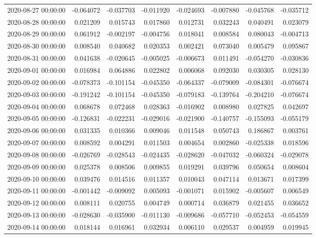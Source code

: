 \begin{tabular}{lrrrrrrr}
2020-08-27 00:00:00 & -0.064072 & -0.037703 & -0.011920 & -0.024693 & -0.007880 & -0.045768 & -0.035712 \\
2020-08-28 00:00:00 & 0.021209 & 0.015743 & 0.017860 & 0.012731 & 0.032243 & 0.040491 & 0.023079 \\
2020-08-29 00:00:00 & 0.061912 & -0.002197 & -0.004756 & 0.018041 & 0.008584 & 0.080043 & -0.004713 \\
2020-08-30 00:00:00 & 0.008540 & 0.040682 & 0.020353 & 0.002421 & 0.073040 & 0.005479 & 0.095867 \\
2020-08-31 00:00:00 & 0.041638 & -0.020645 & -0.005025 & -0.006673 & 0.011491 & -0.054270 & -0.030836 \\
2020-09-01 00:00:00 & 0.016984 & 0.064886 & 0.022802 & 0.006068 & 0.092030 & 0.030305 & 0.028130 \\
2020-09-02 00:00:00 & -0.078373 & -0.101154 & -0.045350 & -0.064337 & -0.079009 & -0.084301 & -0.076674 \\
2020-09-03 00:00:00 & -0.191242 & -0.101154 & -0.045350 & -0.079183 & -0.139764 & -0.204210 & -0.076674 \\
2020-09-04 00:00:00 & 0.068678 & 0.072468 & 0.028363 & -0.016902 & 0.008980 & 0.027825 & 0.042697 \\
2020-09-05 00:00:00 & -0.126831 & -0.022231 & -0.029016 & -0.021900 & -0.140757 & -0.155093 & -0.055179 \\
2020-09-06 00:00:00 & 0.031335 & 0.010366 & 0.009046 & 0.011548 & 0.050743 & 0.186867 & 0.003761 \\
2020-09-07 00:00:00 & 0.008592 & 0.004291 & 0.011503 & 0.004654 & 0.002860 & -0.025338 & 0.018596 \\
2020-09-08 00:00:00 & -0.026769 & -0.028543 & -0.024435 & -0.028620 & -0.047032 & -0.060324 & -0.029078 \\
2020-09-09 00:00:00 & 0.025378 & 0.008506 & 0.009855 & 0.019291 & 0.039796 & 0.050654 & 0.008604 \\
2020-09-10 00:00:00 & 0.039476 & 0.014516 & 0.011357 & 0.010043 & 0.047114 & 0.013671 & 0.017399 \\
2020-09-11 00:00:00 & -0.001442 & -0.009092 & 0.005093 & -0.001071 & 0.015902 & -0.005607 & 0.006549 \\
2020-09-12 00:00:00 & 0.008111 & 0.020755 & 0.004749 & 0.000714 & 0.036879 & 0.021455 & 0.036652 \\
2020-09-13 00:00:00 & -0.028630 & -0.035900 & -0.011130 & -0.009686 & -0.057710 & -0.052453 & -0.054559 \\
2020-09-14 00:00:00 & 0.018144 & 0.016961 & 0.032934 & 0.006110 & 0.029537 & 0.004959 & 0.019945 \\

\end{tabular}
